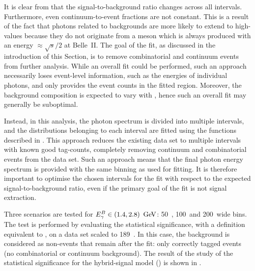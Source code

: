 It is clear from  that the signal-to-background ratio changes across all \EB intervals.
Furthermore, even continuum-to-\BB event fractions are not constant.
This is a result of the fact that photons related to \epem\ra\qqbar backgrounds are more likely to extend to high-\EB values because they do not originate from a \B meson which is always produced with an energy $\approx\sqrt{s}/2$ at Belle~II.
The goal of the fit, as discussed in the introduction of this Section, is to remove combinatorial \BB and continuum events from further analysis.
While an overall \Mbc fit could be performed, such an approach necessarily loses event-level information, such as the energies of individual photons, and only provides the event counts in the fitted \EB region.
Moreover, the background composition is expected to vary with \EB, hence such an overall fit may generally be suboptimal.

Instead, in this analysis, the photon spectrum is divided into multiple \EB intervals, and the \Mbc distributions belonging to each interval are fitted using the functions described in .
This approach reduces the existing data set to multiple \EB intervals with known good tag-\B counts, completely removing continuum and combinatorial \BB events from the data set.
Such an approach means that the final photon energy spectrum is provided with the same binning as used for fitting.
It is therefore important to optimise the chosen intervals for the fit with respect to the expected \BtoXsgamma signal-to-background ratio, 
even if the primary goal of the fit is not signal extraction.

Three scenarios are tested for ${E^B_{\gamma}}\in(1.4,2.8)~\mathrm{\,Ge\kern -0.1em V}$: 50~\mev, 100~\mev and 200~\mev wide bins.
The test is performed by evaluating the statistical significance, with a definition equivalent to , on a data set scaled to 189~\invfb.
In this case, the background is considered as non-\BtoXsgamma events that remain after the \Mbc fit: only correctly tagged \BB events (no combinatorial or continuum background).
The result of the study of the statistical significance for the hybrid-signal model () is shown in .

